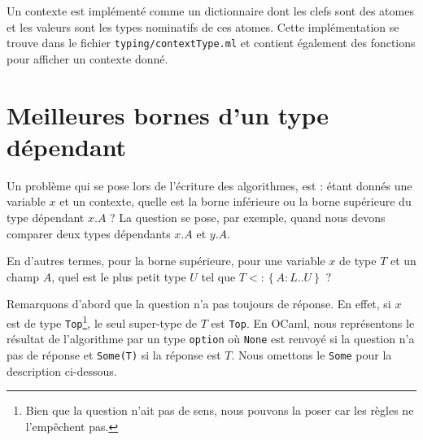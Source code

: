Un contexte est implémenté comme un dictionnaire dont les clefs sont des atomes
et les valeurs sont les types nominatifs de ces atomes. Cette implémentation se
trouve dans le fichier \verb|typing/contextType.ml| et contient également
des fonctions pour afficher un contexte donné.


%

\section{Meilleures bornes d'un type dépendant}

Un problème qui se pose lors de l'écriture des algorithmes, est : étant donnés une variable
$x$ et un contexte, quelle est la borne inférieure ou la borne supérieure du
type dépendant $x.A$ ? La question se pose, par exemple, quand nous devons
comparer deux types dépendants $x.A$ et $y.A$.

En d'autres termes, pour la borne supérieure, pour une variable $x$ de type $T$ et
un champ $A$, quel est le plus petit type $U$ tel que $T <: \left\{ A : L .. U
\right\}$ ?

Remarquons d'abord que la question n'a pas toujours de réponse. En effet, si $x$
est de type \verb|Top|\footnote{Bien que la question n'ait pas de sens, nous
  pouvons la poser car les règles ne l'empêchent pas.}, le seul super-type de
$T$ est \verb|Top|. En OCaml, nous représentons le résultat de l'algorithme par un
type \verb|option| où \verb|None| est renvoyé si la question n'a pas de réponse
et \verb|Some(T)| si la réponse est $T$. Nous omettons le \verb|Some| pour la
description ci-dessous.

